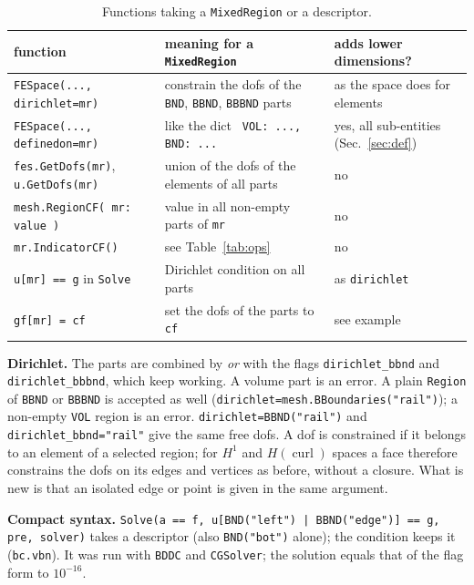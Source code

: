 \documentclass[10pt,a4paper]{article}
\newcommand{\code}[1]{\texttt{#1}}
\newcommand{\lbr}{\char123 }\newcommand{\rbr}{\char125 }\newcommand{\tld}{\char126 }
\begin{document}
\begin{table}[h]\centering\small
\begin{tabular}{@{}lll@{}}\toprule
function & meaning for a \code{MixedRegion} & adds lower dimensions?\\\midrule
\code{FESpace(..., dirichlet=mr)} & constrain the dofs of the \code{BND}, \code{BBND}, \code{BBBND} parts & as the space does for elements\\
\code{FESpace(..., definedon=mr)} & like the dict \code{\lbr VOL: ..., BND: ...\rbr} & yes, all sub-entities (Sec.~\ref{sec:def})\\
\code{fes.GetDofs(mr)}, \code{u.GetDofs(mr)} & union of the dofs of the elements of all parts & no\\
\code{mesh.RegionCF(\lbr mr: value\rbr)} & value in all non-empty parts of \code{mr} & no\\
\code{mr.IndicatorCF()} & see Table~\ref{tab:ops} & no\\
\code{u[mr] == g} in \code{Solve} & Dirichlet condition on all parts & as \code{dirichlet}\\
\code{gf[mr] = cf} & set the dofs of the parts to \code{cf} & see example\\
\bottomrule\end{tabular}
\caption{Functions taking a \code{MixedRegion} or a descriptor.}\label{tab:use}
\end{table}

\textbf{Dirichlet.} The parts are combined by \emph{or} with the flags \code{dirichlet\_bbnd} and \code{dirichlet\_bbbnd}, which keep working. A volume part is an error. A plain \code{Region} of \code{BBND} or \code{BBBND} is accepted as well (\code{dirichlet=mesh.BBoundaries("rail")}); a non-empty \code{VOL} region is an error. \code{dirichlet=BBND("rail")} and \code{dirichlet\_bbnd="rail"} give the same free dofs. A dof is constrained if it belongs to an element of a selected region; for $H^1$ and $H(\operatorname{curl})$ spaces a face therefore constrains the dofs on its edges and vertices as before, without a closure. What is new is that an isolated edge or point is given in the same argument.

\textbf{Compact syntax.} \code{Solve(a == f, u[BND("left") | BBND("edge")] == g, pre, solver)} takes a descriptor (also \code{BND("bot")} alone); the condition keeps it (\code{bc.vbn}). It was run with \code{BDDC} and \code{CGSolver}; the solution equals that of the flag form to $10^{-16}$.
\end{document}
